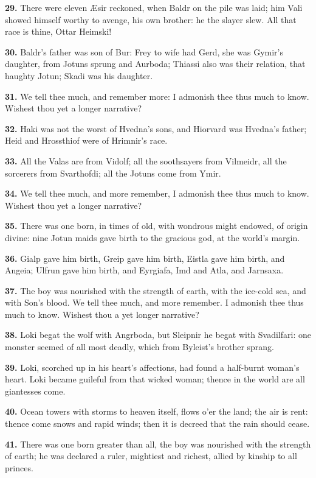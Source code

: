 \textbf{29.} There were eleven Æsir reckoned, when Baldr on the pile was
laid; him Vali showed himself worthy to avenge, his own brother: he
the slayer slew. All that race is thine, Ottar Heimski!

\textbf{30.} Baldr's father was son of Bur: Frey to wife had Gerd, she was
Gymir's daughter, from Jotuns sprung and Aurboda; Thiassi also was
their relation, that haughty Jotun; Skadi was his daughter.

\textbf{31.} We tell thee much, and remember more: I admonish thee thus much
to know. Wishest thou yet a longer narrative?

\textbf{32.} Haki was not the worst of Hvedna's sons, and Hiorvard was
Hvedna's father; Heid and Hrossthiof were of Hrimnir's race.

\textbf{33.} All the Valas are from Vidolf; all the soothsayers from
Vilmeidr, all the sorcerers from Svarthofdi; all the Jotuns come from
Ymir.

\textbf{34.} We tell thee much, and more remember, I admonish thee thus much
to know. Wishest thou yet a longer narrative?

\textbf{35.} There was one born, in times of old, with wondrous might
endowed, of origin divine: nine Jotun maids gave birth to the gracious
god, at the world's margin.

\textbf{36.} Gialp gave him birth, Greip gave him birth, Eistla gave him
birth, and Angeia; Ulfrun gave him birth, and Eyrgiafa, Imd and Atla,
and Jarnsaxa.

\textbf{37.} The boy was nourished with the strength of earth, with the
ice-cold sea, and with Son's blood. We tell thee much, and more
remember. I admonish thee thus much to know. Wishest thou a yet longer
narrative?

\textbf{38.} Loki begat the wolf with Angrboda, but Sleipnir he begat with
Svadilfari: one monster seemed of all most deadly, which from
Byleist's brother sprang.

\textbf{39.} Loki, scorched up in his heart's affections, had found a
half-burnt woman's heart. Loki became guileful from that wicked woman;
thence in the world are all giantesses come.

\textbf{40.} Ocean towers with storms to heaven itself, flows o'er the land;
the air is rent: thence come snows and rapid winds; then it is decreed
that the rain should cease.

\textbf{41.} There was one born greater than all, the boy was nourished with
the strength of earth; he was declared a ruler, mightiest and richest,
allied by kinship to all princes.

